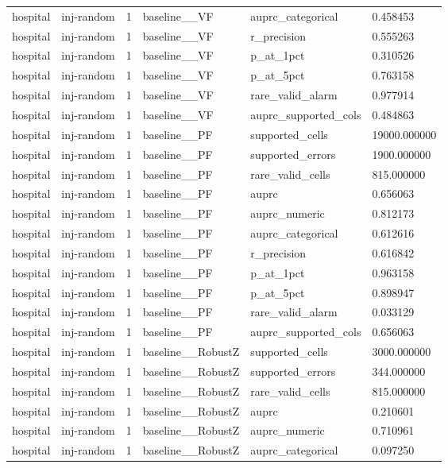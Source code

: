 \begin{tabular}{llllll}
hospital & inj-random & 1 & baseline\_\_VF & auprc\_categorical & 0.458453 \\
hospital & inj-random & 1 & baseline\_\_VF & r\_precision & 0.555263 \\
hospital & inj-random & 1 & baseline\_\_VF & p\_at\_1pct & 0.310526 \\
hospital & inj-random & 1 & baseline\_\_VF & p\_at\_5pct & 0.763158 \\
hospital & inj-random & 1 & baseline\_\_VF & rare\_valid\_alarm & 0.977914 \\
hospital & inj-random & 1 & baseline\_\_VF & auprc\_supported\_cols & 0.484863 \\
hospital & inj-random & 1 & baseline\_\_PF & supported\_cells & 19000.000000 \\
hospital & inj-random & 1 & baseline\_\_PF & supported\_errors & 1900.000000 \\
hospital & inj-random & 1 & baseline\_\_PF & rare\_valid\_cells & 815.000000 \\
hospital & inj-random & 1 & baseline\_\_PF & auprc & 0.656063 \\
hospital & inj-random & 1 & baseline\_\_PF & auprc\_numeric & 0.812173 \\
hospital & inj-random & 1 & baseline\_\_PF & auprc\_categorical & 0.612616 \\
hospital & inj-random & 1 & baseline\_\_PF & r\_precision & 0.616842 \\
hospital & inj-random & 1 & baseline\_\_PF & p\_at\_1pct & 0.963158 \\
hospital & inj-random & 1 & baseline\_\_PF & p\_at\_5pct & 0.898947 \\
hospital & inj-random & 1 & baseline\_\_PF & rare\_valid\_alarm & 0.033129 \\
hospital & inj-random & 1 & baseline\_\_PF & auprc\_supported\_cols & 0.656063 \\
hospital & inj-random & 1 & baseline\_\_RobustZ & supported\_cells & 3000.000000 \\
hospital & inj-random & 1 & baseline\_\_RobustZ & supported\_errors & 344.000000 \\
hospital & inj-random & 1 & baseline\_\_RobustZ & rare\_valid\_cells & 815.000000 \\
hospital & inj-random & 1 & baseline\_\_RobustZ & auprc & 0.210601 \\
hospital & inj-random & 1 & baseline\_\_RobustZ & auprc\_numeric & 0.710961 \\
hospital & inj-random & 1 & baseline\_\_RobustZ & auprc\_categorical & 0.097250 \\

\end{tabular}
